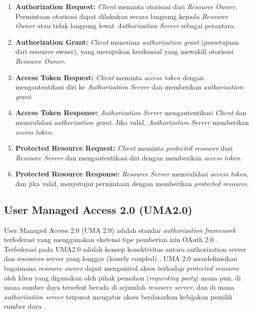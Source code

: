 \begin{enumerate}
    \item \textbf{Authorization Request:} \textit{Client} meminta otorisasi dari \textit{Resource Owner}. Permintaan otorisasi dapat dilakukan secara langsung kepada \textit{Resource Owner} atau tidak langsung lewat \textit{Authorization Server} sebagai perantara.
    
    \item \textbf{Authorization Grant:} \textit{Client} menerima \textit{authorization grant} (persetujuan dari resource owner), yang merupakan kredensial yang mewakili otorisasi \textit{Resource Owner}.
    
    \item \textbf{Access Token Request:} \textit{Client} meminta \textit{access token} dengan mengautentikasi diri ke \textit{Authorization Server} dan memberikan \textit{authorization grant}.
    
    \item \textbf{Access Token Response:} \textit{Authorization Server} mengautentikasi \textit{Client} dan memvalidasi \textit{authorization grant}. Jika valid, \textit{Authorization Server} memberikan \textit{access token}.
    
    \item \textbf{Protected Resource Request:} \textit{Client} meminta \textit{protected resource} dari \textit{Resource Server} dan mengautentikasi diri dengan memberikan \textit{access token}.
    
    \item \textbf{Protected Resource Response:} \textit{Resource Server} memvalidasi \textit{access token}, dan jika valid, menyetujui permintaan dengan memberikan \textit{protected resource}.
\end{enumerate}



\subsection{User Managed Access 2.0 (UMA2.0)}

User Managed Access 2.0 (UMA 2.0) adalah standar \textit{authorization framework} terfederasi yang menggunakan ekstensi tipe pemberian izin OAuth 2.0 \autocite{umaspec}.
Terfederasi pada UMA2.0 adalah konsep konektivitas antara authorization server dan resources server yang longgar (loosely coupled) \autocite{umafederatedspec}.
UMA 2.0 mendefinisikan bagaimana \textit{resource owner} dapat mengontrol akses terhadap \textit{protected resource} oleh klien yang digunakan oleh pihak pemohon (\textit{requesting party}) mana pun, di mana sumber daya tersebut berada di sejumlah \textit{resource server}, dan di mana \textit{authorization server} terpusat mengatur akses berdasarkan kebijakan pemilik sumber daya \autocite{umaspec}.

